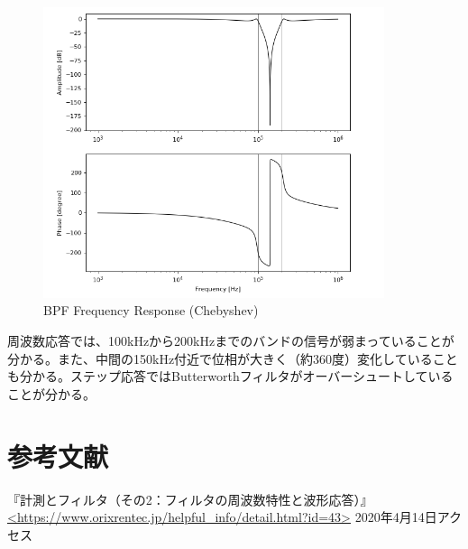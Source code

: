 \documentclass[a4j,dvipdfmx]{article}
\begin{document}
\begin{enumerate}[label={(\arabic*)}]
\begin{figure}[H]
    \begin{center}
     	\includegraphics[width=10cm]{BEF_C_f.png}
        \caption{BPF Frequency Response (Chebyshev)}
    \end{center}
\end{figure}


周波数応答では、100kHzから200kHzまでのバンドの信号が弱まっていることが分かる。また、中間の150kHz付近で位相が大きく（約360度）変化していることも分かる。ステップ応答ではButterworthフィルタがオーバーシュートしていることが分かる。
\section{参考文献}
『計測とフィルタ（その2：フィルタの周波数特性と波形応答）』\url{<https://www.orixrentec.jp/helpful_info/detail.html?id=43>} 2020年4月14日アクセス
\end{enumerate}
\end{document}
